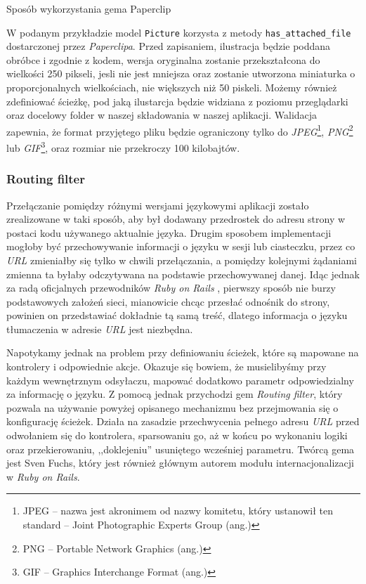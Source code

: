 \documentclass[a4paper,12pt]{article}
\begin{document}
\begin{listing}
  
  \caption{Sposób wykorzystania gema Paperclip}
  \label{listing:paperclip}
\end{listing}


W podanym przykładzie model \texttt{Picture} korzysta z metody \texttt{has\_attached\_file}
dostarczonej przez \emph{Paperclipa}. Przed zapisaniem, ilustracja będzie poddana obróbce
i zgodnie z kodem, wersja oryginalna zostanie przekształcona do wielkości 250 pikseli,
jesli nie jest mniejsza oraz zostanie utworzona miniaturka o proporcjonalnych
wielkościach, nie większych niż 50 piskeli. Możemy również zdefiniować ścieżkę, pod jaką
ilustarcja będzie widziana z poziomu przeglądarki oraz docelowy folder w naszej
składowania w naszej aplikacji. Walidacja zapewnia, że format przyjętego pliku będzie
ograniczony tylko do \emph{JPEG}\footnote{JPEG -- nazwa jest akronimem od nazwy komitetu,
który ustanowił ten standard -- Joint Photographic Experts Group (ang.)},
\emph{PNG}\footnote{PNG -- Portable Network Graphics (ang.)} lub \emph{GIF}\footnote{GIF --
Graphics Interchange Format (ang.)}, oraz rozmiar nie przekroczy 100 kilobajtów.

\subsubsection{Routing filter}
Przełączanie pomiędzy różnymi wersjami językowymi aplikacji zostało zrealizowane w taki
sposób, aby był dodawany przedrostek do adresu strony w postaci kodu używanego aktualnie
języka. Drugim sposobem implementacji mogłoby być przechowywanie informacji o języku w sesji
lub ciasteczku, przez co \emph{URL} zmieniałby się tylko w chwili przełączania, a pomiędzy
kolejnymi żądaniami zmienna ta byłaby odczytywana na podstawie przechowywanej danej.
Idąc jednak za radą oficjalnych przewodników \emph{Ruby on Rails} \cite{rails-guides},
pierwszy sposób nie burzy podstawowych założeń sieci, mianowicie chcąc przesłać odnośnik
do strony, powinien on przedstawiać dokładnie tą samą treść, dlatego informacja o języku
tłumaczenia w adresie \emph{URL} jest niezbędna.


Napotykamy jednak na problem przy definiowaniu ścieżek, które są mapowane na kontrolery i
odpowiednie akcje. Okazuje się bowiem, że musielibyśmy przy każdym wewnętrznym odsyłaczu,
mapować dodatkowo parametr odpowiedzialny za informację o języku. Z pomocą jednak
przychodzi gem \emph{Routing filter}, który pozwala na używanie powyżej opisanego
mechanizmu bez przejmowania się o konfigurację ścieżek. Działa na zasadzie przechwycenia
pełnego adresu \emph{URL} przed odwołaniem się do kontrolera, sparsowaniu go, aż w końcu
po wykonaniu logiki oraz przekierowaniu, ,,doklejeniu'' usuniętego wcześniej parametru.
Twórcą gema jest Sven Fuchs, który jest również głównym autorem modułu internacjonalizacji
w \emph{Ruby on Rails}.
\end{document}
